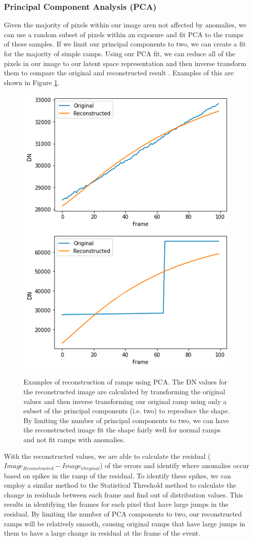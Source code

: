 \subsubsection{Principal Component Analysis (PCA)}
Given the majority of pixels within our image aren not affected by anomalies, we can use a random subset of pixels within an exposure and fit PCA to the ramps of these samples.
If we limit our principal components to two, we can create a fit for the majority of simple ramps. 
Using our PCA fit, we can reduce all of the pixels in our image to our latent space representation and then inverse transform them to compare the original and reconstructed result \parencite{wold1987principal}.
Examples of this are shown in Figure \ref{rst/fig:PCA}. 

\begin{figure}
    \centering
    \includegraphics[width=0.49\linewidth]{figs/rst/PCA_Good.png}
    \includegraphics[width=0.49\linewidth]{figs/rst/PCA_Bad.png}
    \caption{Examples of reconstruction of ramps using PCA. The DN values for the reconstructed image are calculated by transforming the original values and then inverse transforming our original ramp using only a subset of the principal components (i.e. two) to reproduce the shape. By limiting the number of principal components to two, we can have the reconstructed image fit the shape fairly well for normal ramps and not fit ramps with anomalies.}
    \label{rst/fig:PCA}
\end{figure}

With the reconstructed values, we are able to calculate the residual ($Image_{Reconstructed} - Image_{Original}$) of the errors and identify where anomalies occur based on spikes in the ramp of the residual. 
To identify these spikes, we can employ a similar method to the Statistical Threshold method to calculate the change in residuals between each frame and find out of distribution values. 
This results in identifying the frames for each pixel that have large jumps in the residual. 
By limiting the number of PCA components to two, our reconstructed ramps will be relatively smooth, causing original ramps that have large jumps in them to have a large change in residual at the frame of the event.

